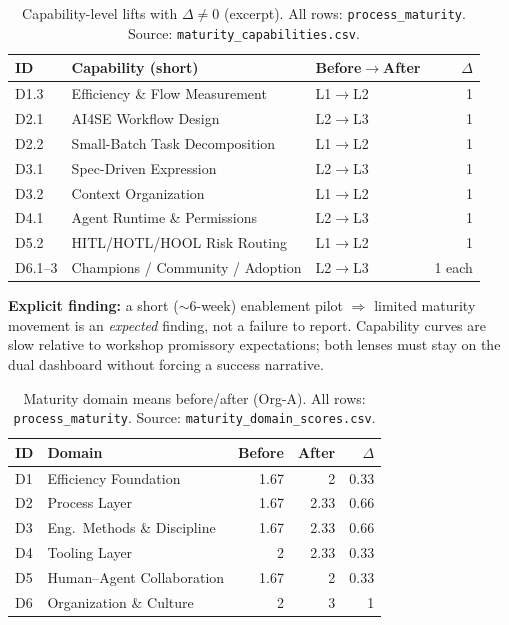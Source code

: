\documentclass[10pt,conference]{IEEEtran}
\begin{document}
\begin{table}[!t]
\centering
\caption{Capability-level lifts with $\Delta\neq0$ (excerpt). All rows: \texttt{process\_maturity}. Source: \texttt{maturity\_capabilities.csv}.}
\label{tab:maturity-cap-excerpt}
\begin{tabular}{@{}lllr@{}}
\toprule
ID & Capability (short) & Before$\rightarrow$After & $\Delta$ \\
\midrule
D1.3 & Efficiency \& Flow Measurement & L1$\rightarrow$L2 & 1 \\
D2.1 & AI4SE Workflow Design & L2$\rightarrow$L3 & 1 \\
D2.2 & Small-Batch Task Decomposition & L1$\rightarrow$L2 & 1 \\
D3.1 & Spec-Driven Expression & L2$\rightarrow$L3 & 1 \\
D3.2 & Context Organization & L1$\rightarrow$L2 & 1 \\
D4.1 & Agent Runtime \& Permissions & L2$\rightarrow$L3 & 1 \\
D5.2 & HITL/HOTL/HOOL Risk Routing & L1$\rightarrow$L2 & 1 \\
D6.1--3 & Champions / Community / Adoption & L2$\rightarrow$L3 & 1 each \\
\bottomrule
\end{tabular}
\end{table}

\textbf{Explicit finding:} a short ($\sim$6-week) enablement pilot $\Rightarrow$ limited maturity movement is an \emph{expected} finding, not a failure to report.
Capability curves are slow relative to workshop promissory expectations; both lenses must stay on the dual dashboard without forcing a success narrative.

\begin{table}[!t]
\centering
\caption{Maturity domain means before/after (Org-A). All rows: \texttt{process\_maturity}. Source: \texttt{maturity\_domain\_scores.csv}.}
\label{tab:maturity-domains}
\begin{tabular}{@{}llrrr@{}}
\toprule
ID & Domain & Before & After & $\Delta$ \\
\midrule
D1 & Efficiency Foundation & 1.67 & 2 & 0.33 \\
D2 & Process Layer & 1.67 & 2.33 & 0.66 \\
D3 & Eng.\ Methods \& Discipline & 1.67 & 2.33 & 0.66 \\
D4 & Tooling Layer & 2 & 2.33 & 0.33 \\
D5 & Human--Agent Collaboration & 1.67 & 2 & 0.33 \\
D6 & Organization \& Culture & 2 & 3 & 1 \\
\bottomrule
\end{tabular}
\end{table}
\end{document}
